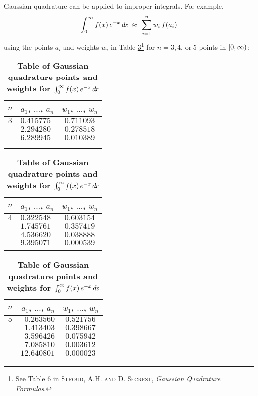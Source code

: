Gaussian quadrature can be applied to improper integrals. For example,
\[
\int_0^{\infty} f(x)\,e^{-x}\,d\!x ~\approx~ \sum_{i=1}^n w_i\,f(a_i)
\]
using the points $a_i$ and weights $w_i$ in
Table \ref{tbl:gaussquadimp}\footnote{See Table 6 in \textsc{Stroud, A.H. and
D. Secrest}, \emph{Gaussian Quadrature Formulas}.} for $n=3, 4$, or 5 points
in $\lbrack 0,\infty )$:

\begin{center}\vspace{-8mm}
\begin{table}[ht]
\caption{\enskip \textbf{Table of Gaussian quadrature points and weights for
$\int_0^{\infty} f(x)\,e^{-x}\,d\!x$}}\vspace{2mm}
\small{\begin{center}{\begin{tabular}{|c|l|c|}
\hline
\rowcolor{fillcolor}
$n$ & $a_1$, $\ldots$, $a_n$ & $w_1$, $\ldots$, $w_n$\\
\hline
$3$ & $0.415775$ & $0.711093$\\
{}  & $2.294280$ & $0.278518$\\
{}  & $6.289945$ & $0.010389$\\
{} & {} & {}\\
{} & {} & {}\\
\hline
\end{tabular}
\quad
\begin{tabular}{|c|l|c|}
\hline
\rowcolor{fillcolor}
$n$ & $a_1$, $\ldots$, $a_n$ & $w_1$, $\ldots$, $w_n$\\
\hline
$4$ & $0.322548$ & $0.603154$\\
{}  & $1.745761$ & $0.357419$\\
{}  & $4.536620$ & $0.038888$\\
{}  & $9.395071$ & $0.000539$\\
{} & {} & {}\\
\hline
\end{tabular}
\quad
\begin{tabular}{|c|r|c|}
\hline
\rowcolor{fillcolor}
$n$ & $a_1$, $\ldots$, $a_n$ & $w_1$, $\ldots$, $w_n$\\
\hline
$5$ & $0.263560$ & $0.521756$\\
{}  & $1.413403$ & $0.398667$\\
{}  & $3.596426$ & $0.075942$\\
{}  & $7.085810$ & $0.003612$\\
{}  & $12.640801$ & $0.000023$\\
\hline
\end{tabular}}
\end{center}}\label{tbl:gaussquadimp}
\end{table}
\end{center}
